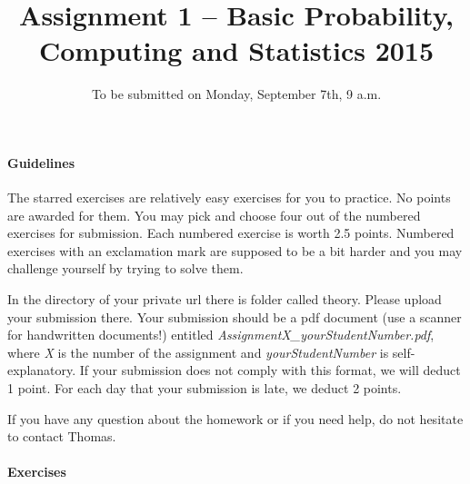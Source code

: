 \documentclass{article}
\title{Assignment 1 -- Basic Probability, Computing and Statistics 2015}
\author{}
\date{To be submitted on Monday, September 7th, 9 a.m.}
\begin{document}
\maketitle

\paragraph{Guidelines}
The starred exercises are relatively easy exercises for you to practice. No points are awarded for them. You may pick and choose four out of the numbered
exercises for submission. Each numbered exercise is worth 2.5 points. Numbered exercises with an exclamation mark are supposed to be a bit harder and you
may challenge yourself by trying to solve them.

In the directory of your private url there is folder called theory. Please upload your submission there. Your submission should be
a pdf document (use a scanner for handwritten documents!) entitled \textit{AssignmentX\_yourStudentNumber.pdf}, where \textit{X} is the number of the
assignment and \textit{yourStudentNumber} is self-explanatory. If your submission does not comply with this format, we will deduct 1 point. For each day that
your submission is late, we deduct 2 points.

If you have any question about the homework or if you need help, do not hesitate to contact Thomas.

\paragraph{Exercises}
\end{document}
